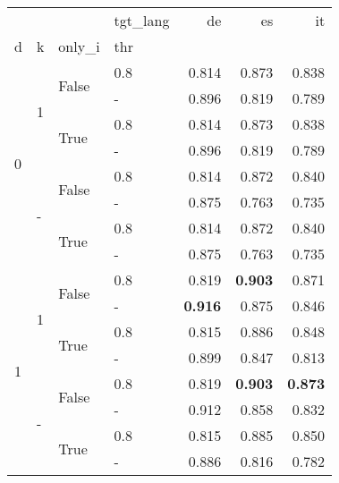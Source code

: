 \begin{tabular}{llllrrr}
  \toprule
  &  &  & tgt\_lang & de & es & it \\
  d & k & only\_i & thr &  &  &  \\
  \midrule
  \multirow[t]{8}{*}{0} & \multirow[t]{4}{*}{1} & \multirow[t]{2}{*}{False} & 0.8 & 0.814 & 0.873 & 0.838 \\
  &  &  & - & 0.896 & 0.819 & 0.789 \\
  \cline{3-7}
  &  & \multirow[t]{2}{*}{True} & 0.8 & 0.814 & 0.873 & 0.838 \\
  &  &  & - & 0.896 & 0.819 & 0.789 \\
  \cline{2-7} \cline{3-7}
  & \multirow[t]{4}{*}{-} & \multirow[t]{2}{*}{False} & 0.8 & 0.814 & 0.872 & 0.840 \\
  &  &  & - & 0.875 & 0.763 & 0.735 \\
  \cline{3-7}
  &  & \multirow[t]{2}{*}{True} & 0.8 & 0.814 & 0.872 & 0.840 \\
  &  &  & - & 0.875 & 0.763 & 0.735 \\
  \cline{1-7} \cline{2-7} \cline{3-7}
  \multirow[t]{8}{*}{1} & \multirow[t]{4}{*}{1} & \multirow[t]{2}{*}{False} & 0.8 & 0.819 & \textbf{0.903} & 0.871 \\
  &  &  & - & \textbf{0.916} & 0.875 & 0.846 \\
  \cline{3-7}
  &  & \multirow[t]{2}{*}{True} & 0.8 & 0.815 & 0.886 & 0.848 \\
  &  &  & - & 0.899 & 0.847 & 0.813 \\
  \cline{2-7} \cline{3-7}
  & \multirow[t]{4}{*}{-} & \multirow[t]{2}{*}{False} & 0.8 & 0.819 & \textbf{0.903} & \textbf{0.873} \\
  &  &  & - & 0.912 & 0.858 & 0.832 \\
  \cline{3-7}
  &  & \multirow[t]{2}{*}{True} & 0.8 & 0.815 & 0.885 & 0.850 \\
  &  &  & - & 0.886 & 0.816 & 0.782 \\
  \cline{1-7} \cline{2-7} \cline{3-7}
  \bottomrule
\end{tabular}
